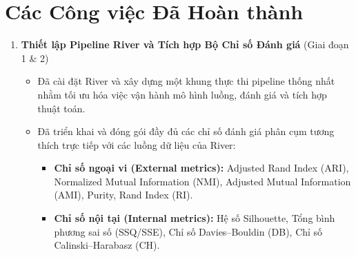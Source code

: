\section{Các Công việc Đã Hoàn thành}
\label{sec:completed}

\begin{enumerate}[label=\textbf{C\arabic*.},leftmargin=2.2em]
  \item \textbf{Thiết lập Pipeline River và Tích hợp Bộ Chỉ số Đánh giá} \hfill{\small(Giai đoạn 1 \& 2)}\\
  \begin{itemize}[leftmargin=1.2em,itemsep=2pt,topsep=1pt]
    \item Đã cài đặt River và xây dựng một khung thực thi pipeline thống nhất nhằm tối ưu hóa việc vận hành mô hình luồng, đánh giá và tích hợp thuật toán.
    \item Đã triển khai và đóng gói đầy đủ các chỉ số đánh giá phân cụm tương thích trực tiếp với các luồng dữ liệu của River:
    \begin{itemize}[leftmargin=1.2em,itemsep=1pt]
      \item \textbf{Chỉ số ngoại vi (External metrics):} Adjusted Rand Index (ARI), Normalized Mutual Information (NMI), Adjusted Mutual Information (AMI), Purity, Rand Index (RI).
      \item \textbf{Chỉ số nội tại (Internal metrics):} Hệ số Silhouette, Tổng bình phương sai số (SSQ/SSE), Chỉ số Davies--Bouldin (DB), Chỉ số Calinski--Harabasz (CH).
    \end{itemize}
  \end{itemize}


\end{enumerate}
